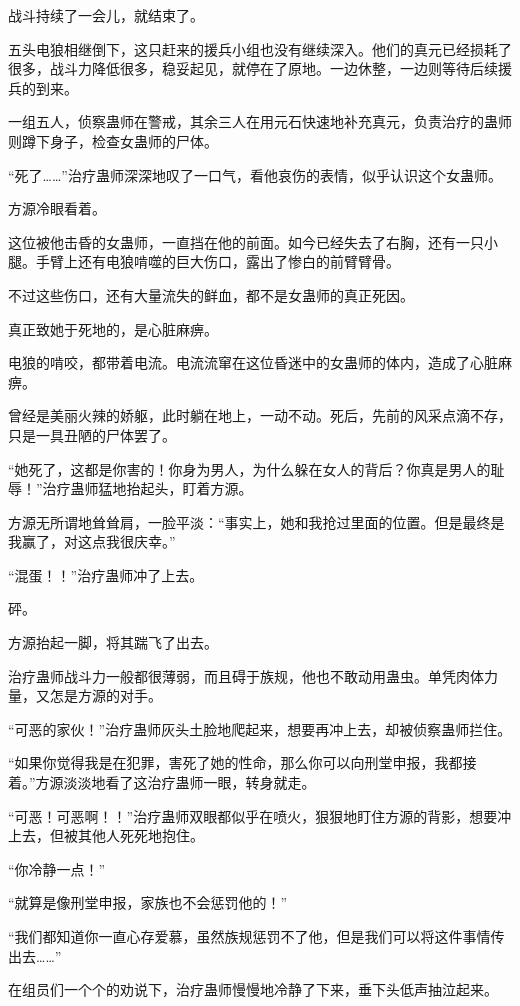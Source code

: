 \begin{this_body}
战斗持续了一会儿，就结束了。

五头电狼相继倒下，这只赶来的援兵小组也没有继续深入。他们的真元已经损耗了很多，战斗力降低很多，稳妥起见，就停在了原地。一边休整，一边则等待后续援兵的到来。

一组五人，侦察蛊师在警戒，其余三人在用元石快速地补充真元，负责治疗的蛊师则蹲下身子，检查女蛊师的尸体。

“死了……”治疗蛊师深深地叹了一口气，看他哀伤的表情，似乎认识这个女蛊师。

方源冷眼看着。

这位被他击昏的女蛊师，一直挡在他的前面。如今已经失去了右胸，还有一只小腿。手臂上还有电狼啃噬的巨大伤口，露出了惨白的前臂臂骨。

不过这些伤口，还有大量流失的鲜血，都不是女蛊师的真正死因。

真正致她于死地的，是心脏麻痹。

电狼的啃咬，都带着电流。电流流窜在这位昏迷中的女蛊师的体内，造成了心脏麻痹。

曾经是美丽火辣的娇躯，此时躺在地上，一动不动。死后，先前的风采点滴不存，只是一具丑陋的尸体罢了。

“她死了，这都是你害的！你身为男人，为什么躲在女人的背后？你真是男人的耻辱！”治疗蛊师猛地抬起头，盯着方源。

方源无所谓地耸耸肩，一脸平淡：“事实上，她和我抢过里面的位置。但是最终是我赢了，对这点我很庆幸。”

“混蛋！！”治疗蛊师冲了上去。

砰。

方源抬起一脚，将其踹飞了出去。

治疗蛊师战斗力一般都很薄弱，而且碍于族规，他也不敢动用蛊虫。单凭肉体力量，又怎是方源的对手。

“可恶的家伙！”治疗蛊师灰头土脸地爬起来，想要再冲上去，却被侦察蛊师拦住。

“如果你觉得我是在犯罪，害死了她的性命，那么你可以向刑堂申报，我都接着。”方源淡淡地看了这治疗蛊师一眼，转身就走。

“可恶！可恶啊！！”治疗蛊师双眼都似乎在喷火，狠狠地盯住方源的背影，想要冲上去，但被其他人死死地抱住。

“你冷静一点！”

“就算是像刑堂申报，家族也不会惩罚他的！”

“我们都知道你一直心存爱慕，虽然族规惩罚不了他，但是我们可以将这件事情传出去……”

在组员们一个个的劝说下，治疗蛊师慢慢地冷静了下来，垂下头低声抽泣起来。


\end{this_body}
